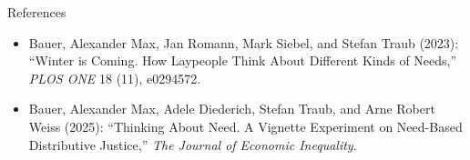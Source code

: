 \documentclass[xcolor=table,9pt,aspectratio=169]{beamer}
\begin{document}
\begin{frame}{\vspace*{10mm}References}
   \vspace*{-10mm}
   {\footnotesize
   \begin{itemize}[label=,leftmargin=2em,itemindent=-2em]
      \item Bauer, Alexander Max, Jan Romann, Mark Siebel, and Stefan Traub (2023): \enquote{Winter is Coming. How Laypeople Think About Different Kinds of Needs,} \textit{PLOS ONE} 18 (11), e0294572.
      \item Bauer, Alexander Max, Adele Diederich, Stefan Traub, and Arne Robert Weiss (2025): \enquote{Thinking About Need. A Vignette Experiment on Need-Based Distributive Justice,} \textit{The Journal of Economic Inequality}.
   \end{itemize}
   }
\end{frame}
\end{document}
